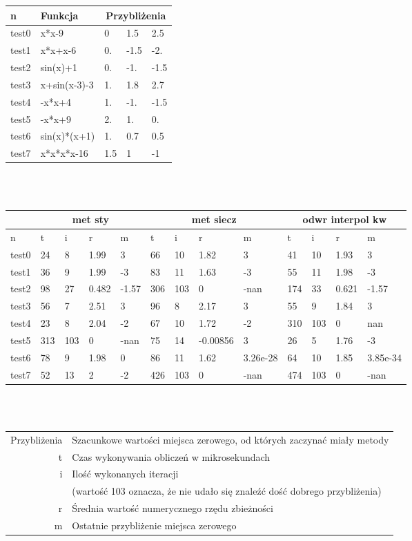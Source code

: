 \begin{table}[h]
  \begin{tabular}{| l l | l l l|}
  \hline
  n & Funkcja & \multicolumn{3}{|c|}{Przybliżenia}\\
  \hline 
test0
&
x*x-9
&
0
&
1.5
&
2.5
\\
test1
&
x*x+x-6
&
0.
&
-1.5
&
-2.
\\
test2
&
sin(x)+1
&
0.
&
-1.
&
-1.5
\\
test3
&
x+sin(x-3)-3
&
1.
&
1.8
&
2.7
\\
test4
&
-x*x+4
&
1.
&
-1.
&
-1.5
\\
test5
&
-x*x+9
&
2.
&
1.
&
0.
\\
test6
&
sin(x)*(x+1)
&
1.
&
0.7
&
0.5
\\
test7
&
x*x*x*x-16
&
1.5
&
1
&
-1
\\
\hline
\end{tabular}\\\\
\begin{tabular}{| l | l l l l| l l l l| l l l l|}
\hline
 & \multicolumn{4}{|c|}{met sty} & \multicolumn{4}{|c}{met siecz} & \multicolumn{4}{|c|}{odwr interpol kw}\\
\hline 
 n &
 t & i & r & m &
 t & i & r & m &
 t & i & r & m \\
\hline

test0
&
24
&
8
&
1.99
&
3
&
66
&
10
&
1.82
&
3
&
41
&
10
&
1.93
&
3
\\
test1
&
36
&
9
&
1.99
&
-3
&
83
&
11
&
1.63
&
-3
&
55
&
11
&
1.98
&
-3
\\
test2
&
98
&
27
&
0.482
&
-1.57
&
306
&
103
&
0
&
-nan
&
174
&
33
&
0.621
&
-1.57
\\
test3
&
56
&
7
&
2.51
&
3
&
96
&
8
&
2.17
&
3
&
55
&
9
&
1.84
&
3
\\
test4
&
23
&
8
&
2.04
&
-2
&
67
&
10
&
1.72
&
-2
&
310
&
103
&
0
&
nan
\\
test5
&
313
&
103
&
0
&
-nan
&
75
&
14
&
-0.00856
&
3
&
26
&
5
&
1.76
&
-3
\\
test6
&
78
&
9
&
1.98
&
0
&
86
&
11
&
1.62
&
3.26e-28
&
64
&
10
&
1.85
&
3.85e-34
\\
test7
&
52
&
13
&
2
&
-2
&
426
&
103
&
0
&
-nan
&
474
&
103
&
0
&
-nan
\\
    \hline  
  \end{tabular}\\\\
  \begin{tabular}{r | l}
    Przybliżenia  & Szacunkowe wartości miejsca zerowego, od których zaczynać miały metody\\
    t             & Czas wykonywania obliczeń w mikrosekundach\\
    i             & Ilość wykonanych iteracji \\ & \indent (wartość 103 oznacza, że nie udało się znaleźć dość dobrego przybliżenia)\\
    r             & Średnia wartość numerycznego rzędu zbieżności\\
    m             & Ostatnie przybliżenie miejsca zerowego\\
  \end{tabular}
\end{table}

